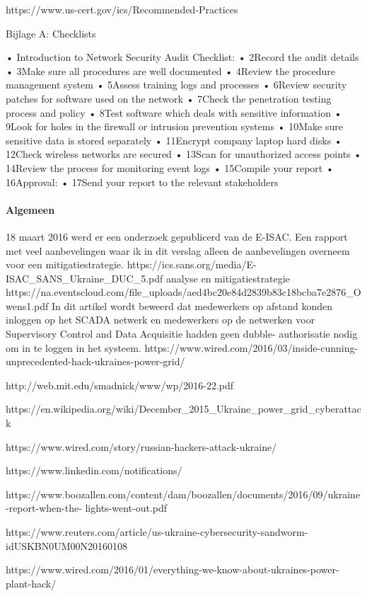 {https://www.us-cert.gov/ics/Recommended-Practices

Bijlage A: Checklists

• Introduction to Network Security Audit Checklist:
• 2Record the audit details
• 3Make sure all procedures are well documented
• 4Review the procedure management system
• 5Assess training logs and processes
• 6Review security patches for software used on the network
• 7Check the penetration testing process and policy
• 8Test software which deals with sensitive information
• 9Look for holes in the firewall or intrusion prevention systems
• 10Make sure sensitive data is stored separately
• 11Encrypt company laptop hard disks
• 12Check wireless networks are secured
• 13Scan for unauthorized access points
• 14Review the process for monitoring event logs
• 15Compile your report
• 16Approval:
• 17Send your report to the relevant stakeholders




 \paragraph{Algemeen}


18 maart 2016 werd er een onderzoek gepublicerd van de E-ISAC. Een rapport met veel
aanbevelingen waar ik in dit verslag alleen de aanbevelingen overneem voor een mitigatiestrategie.
https://ics.sans.org/media/E-ISAC_SANS_Ukraine_DUC_5.pdf
analyse en mitigatiestrategie
https://na.eventscloud.com/file_uploads/aed4bc20e84d2839b83c18bcba7e2876_Owens1.pdf
In dit artikel wordt beweerd dat medewerkers op afstand konden inloggen op het SCADA netwerk en
medewerkers op de netwerken voor Supervisory Control and Data Acquisitie hadden geen dubble-
authorisatie nodig om in te loggen in het systeem.
https://www.wired.com/2016/03/inside-cunning-unprecedented-hack-ukraines-power-grid/

http://web.mit.edu/smadnick/www/wp/2016-22.pdf

https://en.wikipedia.org/wiki/December_2015_Ukraine_power_grid_cyberattack

https://www.wired.com/story/russian-hackers-attack-ukraine/

https://www.linkedin.com/notifications/

https://www.boozallen.com/content/dam/boozallen/documents/2016/09/ukraine-report-when-the-
lights-went-out.pdf

https://www.reuters.com/article/us-ukraine-cybersecurity-sandworm-idUSKBN0UM00N20160108

https://www.wired.com/2016/01/everything-we-know-about-ukraines-power-plant-hack/

}
